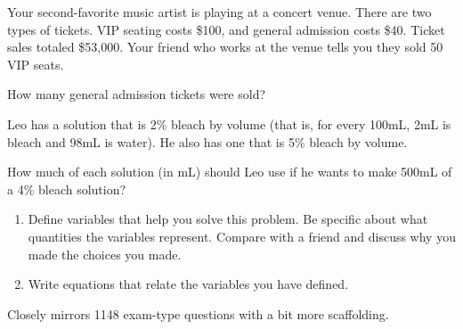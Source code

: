 \documentclass[noauthor,noinstructornotes]{ximera}
\begin{document}
\begin{problem}
Your second-favorite music artist is playing at a concert venue. There are two types of tickets. VIP seating costs \$100, and general admission costs \$40. 
Ticket sales totaled \$53,000. Your friend who works at the venue tells you they sold 50 VIP seats.

How many general admission tickets were sold?
\end{problem}


\begin{problem}
Leo has a solution that is 2\% bleach by volume (that is, for every 100mL, 2mL is bleach and 98mL is water). He also has one that is 5\% bleach by volume. 

How much of each solution (in mL) should Leo use if he wants to make 500mL of a 4\% bleach solution?

\begin{enumerate}
    \item Define variables that help you solve this 
    problem. Be specific about what quantities the variables
    represent. Compare with a friend and discuss why you made 
    the choices you made.
    \item Write equations that relate the variables you 
    have defined.
\end{enumerate}



\begin{instructorNotes}
Closely mirrors 1148 exam-type questions with a bit more scaffolding.
\end{instructorNotes}
\end{problem}
\end{document}
